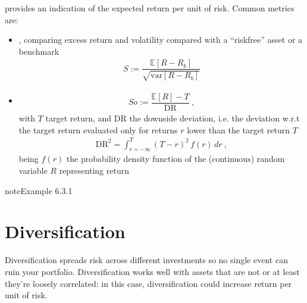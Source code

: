 \documentclass[letterpaper,10pt,english]{jupyterBook}
\begin{document}
\sphinxAtStartPar
{} provides an indication of the expected return per unit of risk. Common metrics are:
\begin{itemize}
\item {} 
\sphinxAtStartPar
{}, comparing excess return and volatility compared with a “risk\sphinxhyphen{}free” asset \sphinxhyphen{} or a benchmark
\begin{equation*}
\begin{split}S := \dfrac{\mathbb{E}[R-R_b]}{\sqrt{\text{var}[R-R_b]}}\end{split}
\end{equation*}
\item {} 
\sphinxAtStartPar
{}
\begin{equation*}
\begin{split}So := \dfrac{\mathbb{E}[R] - T}{\text{DR}} \ ,\end{split}
\end{equation*}
\sphinxAtStartPar
with \(T\) target return, and \(\text{DR}\) the downside deviation, i.e. the deviation w.r.t the target return evaluated only for returns \(r\) lower than the target return \(T\)
\begin{equation*}
\begin{split}\text{DR}^2 = \int_{r=-\infty}^{T} (T-r)^2 \, f(r) \, dr \ ,\end{split}
\end{equation*}
\sphinxAtStartPar
being \(f(r)\) the probability density function of the (continuous) random variable \(R\) representing return

\end{itemize}
\label{ch/principles/intro_nb:example-3}
\begin{sphinxadmonition}{note}{Example 6.3.1}


\end{sphinxadmonition}


\section{Diversification}
\label{\detokenize{ch/principles/intro_nb:diversification}}\label{\detokenize{ch/principles/intro_nb:fin-edu-principles-diversification}}
\sphinxAtStartPar
Diversification spreads risk across different investments so no single event can ruin your portfolio. Diversification works well with assets that are not \sphinxhyphen{} or at least they’re loosely \sphinxhyphen{} correlated: in this case, diversification could increase return per unit of risk.
\end{document}

